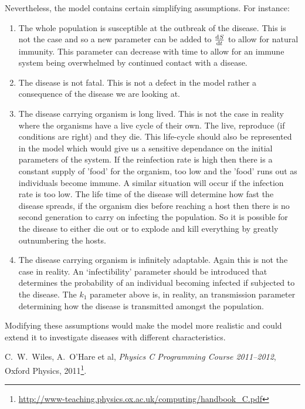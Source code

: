 \documentclass[a4paper,11pt]{article}
\begin{document}
\clearpage
Nevertheless, the model contains certain simplifying assumptions. For instance:
\begin{enumerate}
\item{} The whole population is susceptible at the outbreak of the disease. This 
        is not the case and so a new parameter can be added to $\od{S}{t}$ to 
        allow for natural immunity. This parameter can decrease with time to allow
        for an immune system being overwhelmed by continued contact with a disease.
\item{} The disease is not fatal. This is not a defect in the model rather a
        consequence of the disease we are looking at.
\item{} The disease carrying organism is long lived. This is not the case in 
        reality where the organisms have a live cycle of their own. The live, 
        reproduce (if conditions are right) and they die. This life-cycle should 
        also be represented in the model which would give us a sensitive dependance
        on the initial parameters of the system. If the reinfection rate is high 
        then there is a constant supply of 'food' for the organism, too low and
        the 'food' runs out as individuals become immune. A similar situation
        will occur if the infection rate is too low. The life time of the
        disease will determine how fast the disease spreads, if the organism
        dies before reaching a host then there is no second generation to 
        carry on infecting the population. So it is possible for the disease
        to either die out or to explode and kill everything by greatly 
        outnumbering the hosts.
\item{} The disease carrying organism is infinitely adaptable. Again this is
        not the case in reality. An `infectibility' parameter should be introduced 
        that determines the probability of an individual becoming infected if
        subjected to the disease. The $k_1$ parameter above is, in reality, an
        transmission parameter determining how the disease is transmitted 
        amongst the population.
\end{enumerate}

Modifying these assumptions would make the model more realistic and could extend it to investigate diseases with different characteristics.

\begin{thebibliography}{9}
 C.\ W.\ Wiles, A.\ O'Hare et al, \emph{Physics C Programming  Course 2011--2012}, Oxford Physics, 2011\footnote{\href{http://www-teaching.physics.ox.ac.uk/computing/handbook_C.pdf}{\url{http://www-teaching.physics.ox.ac.uk/computing/handbook_C.pdf}}}.
\end{thebibliography}
\end{document}
